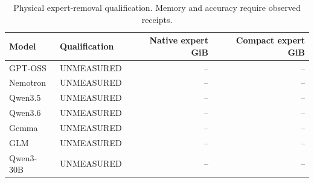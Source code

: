 \begin{table}[t]\centering\small
\caption{Physical expert-removal qualification. Memory and accuracy require observed receipts.}
\label{tab:expert-memory-capability}
\begin{tabular}{llrr}\toprule
Model & Qualification & Native expert GiB & Compact expert GiB \\
\midrule
GPT-OSS & UNMEASURED & -- & -- \\
Nemotron & UNMEASURED & -- & -- \\
Qwen3.5 & UNMEASURED & -- & -- \\
Qwen3.6 & UNMEASURED & -- & -- \\
Gemma & UNMEASURED & -- & -- \\
GLM & UNMEASURED & -- & -- \\
Qwen3-30B & UNMEASURED & -- & -- \\
\bottomrule\end{tabular}\end{table}
